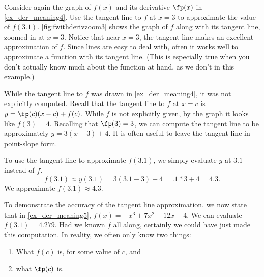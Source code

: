 \begin{example}\label{ex_der_meaning5}
Consider again the graph of $f(x)$ and its derivative $\fp(x)$ in \autoref{ex_der_meaning4}.
%
%
Use the tangent line to $f$ at $x=3$ to approximate the value of $f(3.1)$.
\solution
\autoref{fig:fwithderivzoom3} shows the graph of $f$ along with its tangent line, zoomed in at $x=3$. Notice that near $x=3$, the tangent line makes an excellent approximation of $f$. Since lines are easy to deal with, often it works well to approximate a function with its tangent line. (This is especially true when you don't actually know much about the function at hand, as we don't in this example.)

While the tangent line to $f$ was drawn in \autoref{ex_der_meaning4}, it was not explicitly computed. Recall that the tangent line to $f$ at $x=c$ is $y = \fp(c)(x-c)+f(c)$. While $f$ is not explicitly given, by the graph it looks like $f(3) = 4$. Recalling that $\fp(3) = 3$, we can compute the tangent line to be approximately $y = 3(x-3)+4.$ It is often useful to leave the tangent line in point-slope form.

To use the tangent line to approximate $f(3.1)$, we simply evaluate $y$ at $3.1$ instead of $f$.
\[f(3.1) \approx y(3.1) = 3(3.1-3)+4 = .1*3+4 = 4.3.\]
We approximate $f(3.1) \approx 4.3$.
\end{example}

To demonstrate the accuracy of the tangent line approximation, we now state that in \autoref{ex_der_meaning5}, $f(x) = -x^3+7x^2-12x+4$. We can evaluate $f(3.1) = 4.279$. Had we known $f$ all along, certainly we could have just made this computation. In reality, we often only know two things:
\begin{enumerate}
	\item	What $f(c)$ is, for some value of $c$, and
	\item	what $\fp(c)$ is.
\end{enumerate}
	
